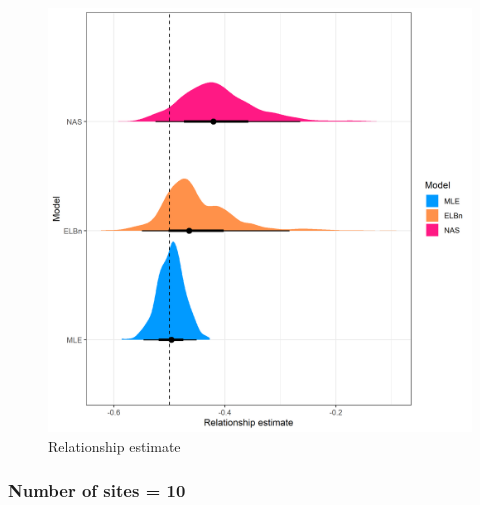 \documentclass[
]{article}
\begin{document}
\begin{figure}
\centering
\includegraphics{figures/PLB_3_sites_relationship_density.png}
\caption{Relationship estimate}
\end{figure}

\newpage

\hypertarget{number-of-sites-10}{%
\subsubsection{Number of sites = 10}\label{number-of-sites-10}}
\end{document}
